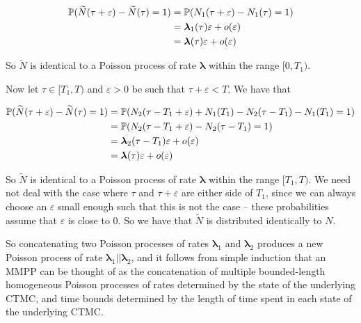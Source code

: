 \begin{align*}
\mathbb{P} (\widetilde{N}(\tau+\varepsilon) - \widetilde{N}(\tau) = 1)
	&= \mathbb{P} (N_1(\tau+\varepsilon) - N_1(\tau) = 1) \\
	&= \bm{\lambda}_1(\tau)\varepsilon + o(\varepsilon) \\
	&= \bm{\lambda}(\tau)\varepsilon + o(\varepsilon)
\end{align*} 

So $\widetilde{N}$ is identical to a Poisson process of rate $\bm{\lambda}$ within the range $[0,T_1)$.

Now let $\tau \in [T_1,T)$ and $\varepsilon>0$ be such that $\tau + \varepsilon < T$. We have that

\begin{align*}
\mathbb{P} (\widetilde{N}(\tau+\varepsilon) - \widetilde{N}(\tau) = 1)
	&= \mathbb{P} (N_2(\tau-T_1+\varepsilon) + N_1(T_1) - N_2(\tau-T_1) - N_1(T_1)= 1)\\
	&= \mathbb{P} (N_2(\tau-T_1+\varepsilon) - N_2(\tau-T_1) = 1)\\
	&= \bm{\lambda}_2(\tau-T_1)\varepsilon + o(\varepsilon) \\
	&= \bm{\lambda}(\tau)\varepsilon + o(\varepsilon)
\end{align*}

So $\widetilde{N}$ is identical to a Poisson process of rate $\bm{\lambda}$ within the range $[T_1,T)$. We need not deal with the case where $\tau$ and $\tau+\varepsilon$ are either side of $T_1$, since we can always choose an $\varepsilon$ small enough such that this is not the case -- these probabilities assume that $\varepsilon$ is close to 0. So we have that $\widetilde{N}$ is distributed identically to $N$.

So concatenating two Poisson processes of rates $\bm{\lambda}_1$ and $\bm{\lambda}_2$ produces a new Poisson process of rate $\bm{\lambda}_1||\bm{\lambda}_2$, and it follows from simple induction that an MMPP can be thought of as the concatenation of multiple bounded-length homogeneous Poisson processes of rates determined by the state of the underlying CTMC, and time bounds determined by the length of time spent in each state of the underlying CTMC.

